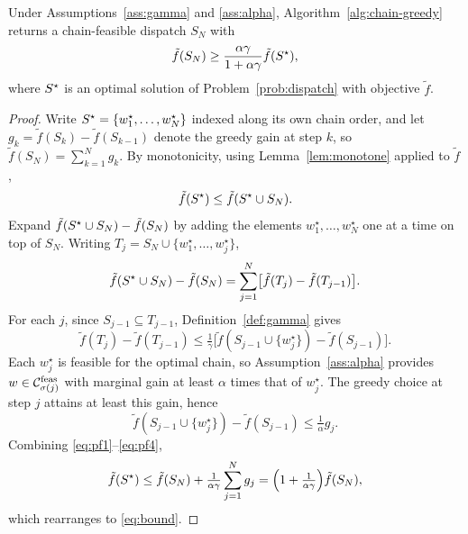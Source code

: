 \begin{theorem}
\label{thm:main}
Under Assumptions~\ref{ass:gamma} and \ref{ass:alpha}, Algorithm~\ref{alg:chain-greedy} returns a chain-feasible dispatch $S_N$ with
\begin{equation} \tilde f(S_N) \geq \frac{\alpha \gamma}{1 + \alpha \gamma} \tilde f(S^{\star}), \label{eq:bound} \end{equation}
where $S^{\star}$ is an optimal solution of Problem~\ref{prob:dispatch} with objective $\tilde f$.
\end{theorem}

\begin{proof}
Write $S^{\star} = \{w^\star_1, \dots, w^\star_N\}$ indexed along its own chain order, and let $g_k = \tilde f(S_k) - \tilde f(S_{k-1})$ denote the greedy gain at step $k$, so $\tilde f(S_N) = \sum_{k=1}^{N} g_k$. By monotonicity, using Lemma~\ref{lem:monotone} applied to $\tilde f$,
\begin{equation} \tilde f(S^{\star}) \leq \tilde f(S^{\star} \cup S_N). \label{eq:pf1} \end{equation}
Expand $\tilde f(S^{\star} \cup S_N) - \tilde f(S_N)$ by adding the elements $w^\star_1, \dots, w^\star_N$ one at a time on top of $S_N$. Writing $T_j = S_N \cup \{w^\star_1, \dots, w^\star_j\}$,
\begin{equation} \tilde f(S^{\star} \cup S_N) - \tilde f(S_N) = \sum_{j=1}^{N} \bigl[ \tilde f(T_j) - \tilde f(T_{j-1}) \bigr]. \label{eq:pf2} \end{equation}
For each $j$, since $S_{j-1} \subseteq T_{j-1}$, Definition~\ref{def:gamma} gives
\begin{equation} \tilde f(T_j) - \tilde f(T_{j-1}) \leq \tfrac{1}{\gamma} \bigl[ \tilde f(S_{j-1} \cup \{w^\star_j\}) - \tilde f(S_{j-1}) \bigr]. \label{eq:pf3} \end{equation}
Each $w^\star_j$ is feasible for the optimal chain, so Assumption~\ref{ass:alpha} provides $w \in \mathcal{C}_{\sigma(j)}^{\mathrm{feas}}$ with marginal gain at least $\alpha$ times that of $w^\star_j$. The greedy choice at step $j$ attains at least this gain, hence
\begin{equation} \tilde f(S_{j-1} \cup \{w^\star_j\}) - \tilde f(S_{j-1}) \leq \tfrac{1}{\alpha} g_j. \label{eq:pf4} \end{equation}
Combining \eqref{eq:pf1}--\eqref{eq:pf4},
\[ \tilde f(S^{\star}) \leq \tilde f(S_N) + \tfrac{1}{\alpha \gamma} \sum_{j=1}^{N} g_j = \Bigl( 1 + \tfrac{1}{\alpha\gamma} \Bigr) \tilde f(S_N), \]
which rearranges to \eqref{eq:bound}.
\end{proof}

